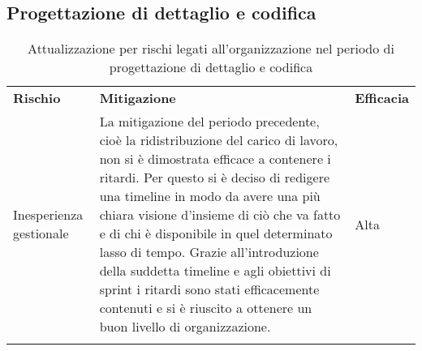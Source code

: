 \subsection{Progettazione di dettaglio e codifica}


	
	\setlength{\freewidth}{\dimexpr\textwidth-0\tabcolsep}
	\renewcommand{\arraystretch}{1.5}
	\setlength{\aboverulesep}{0pt}
	\setlength{\belowrulesep}{0pt}
	\begin{longtable}{L{.210\freewidth} L{.6\freewidth} L{.1\freewidth}}
		\toprule 
		\\
		\toprule
		\textbf{Rischio} & \textbf{Mitigazione} & \textbf{Efficacia}\\
		\hline
		Inesperienza gestionale & La mitigazione del periodo precedente, cioè la ridistribuzione del carico di lavoro, non si è dimostrata efficace a contenere i ritardi. Per questo si è deciso di redigere una timeline in modo da avere una più chiara visione d'insieme di ciò che va fatto e di chi è disponibile in quel determinato lasso di tempo. Grazie all'introduzione della suddetta timeline e agli obiettivi di sprint i ritardi sono stati efficacemente contenuti e si è riuscito a ottenere un buon livello di organizzazione. & Alta\\
		
		\endhead		
		\hiderowcolors
		\caption{Attualizzazione per rischi legati all'organizzazione nel periodo di progettazione di dettaglio e codifica }
	\end{longtable}
	
